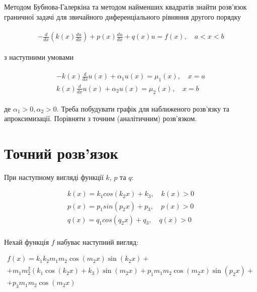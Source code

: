 Методом Бубнова-Галеркіна та методом найменших квадратів знайти розв’язок граничної задачі для звичайного диференціального рівняння другого порядку

\begin{align} \label{problem}  
\begin{split}
-\frac{d}{dx} \left( k(x)\frac{du}{dx} \right) + p(x)\frac{du}{dx} + q(x)u = f(x), \quad a < x < b
\end{split}					
\end{align}

з наступними умовами

\begin{align} \label{conditions}  
\begin{split}
-k(x)\frac{d}{dx}u(x) + \alpha_1 u(x) = \mu_1(x), \quad x = a \\
k(x)\frac{d}{dx}u(x) + \alpha_2 u(x) = \mu_2(x), \quad x = b
\end{split}					
\end{align}

де $\alpha_1 > 0, \alpha_2 > 0$. Треба побудувати графік для наближеного розв'язку та апроксимизації. Порівняти з точним (аналітичним) розв'язком.



\section{Точний розв'язок}

При наступному вигляді функції $k$, $p$ та $q$:

\begin{equation} \label{analytical_solution}  
\begin{split}
k(x) = k_1 cos(k_2 x) + k_3, \quad k(x) > 0 \\
p(x) = p_1 sin(p_2 x) + p_3, \quad p(x) > 0 \\
q(x) = q_1 cos(q_2 x) + q_3, \quad q(x) > 0 \\
\end{split}					
\end{equation}

Нехай функція $f$ набуває наступний вигляд:

\begin{equation}
\begin{multlined} \label{analytical_solution}  
f(x) = k_1 k_2 m_1 m_2 \cos(m_2 x) \sin(k_2 x) + \\ + m_1 m_2^2 \left(k_1 \cos(k_2 x) + k_3 \right)\sin(m_2 x) + p_1 m_1 m_2 \cos(m_2 x) \sin(p_2 x) + \\ +
p_3 m_1 m_2 \cos(m_2 x)
\end{multlined}
\end{equation}

